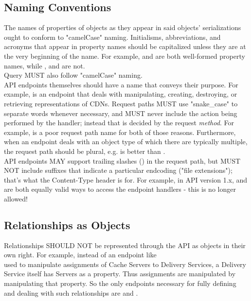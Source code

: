 \subsection{Naming Conventions}
The names of properties of objects as they appear in said objects'
serializations ought to conform to "camelCase" naming. Initialisms,
abbreviations, and acronyms that appear in property names should be capitalized
unless they are at the very beginning of the name. For example,
 and  are both well-formed property names,
while ,  and  are not.\\
Query MUST also follow "camelCase" naming.\\
API endpoints themselves should have a name that conveys their purpose. For
example,  is an endpoint that deals with manipulating, creating,
destroying, or retrieving representations of CDNs. Request paths MUST use
"snake\_case" to separate words whenever necessary, and MUST never include the
action being performed by the handler; instead that is decided by the request
\emph{method}. For example,  is a poor request path name
for both of those reasons. Furthermore, when an endpoint deals with an object
type of which there are typically multiple, the request path should be plural,
e.g.  is better than .\\
API endpoints MAY support trailing slashes (\code{/}) in the request path, but
MUST NOT include suffixes that indicate a particular endcoding
("file extensions"); that's what the Content-Type header is for. For example, in
API version 1.x,  and  are both equally valid ways
to access the  endpoint handlers - this is no longer allowed!

\subsection{Relationships as Objects}
Relationships SHOULD NOT be represented through the API as objects in their own
right. For example, instead of an endpoint like\\
 used to manipulate assignments of Cache
Servers to Delivery Services, a Delivery Service itself has Servers as a
property. Thus assignments are manipulated by manipulating that property. So the
only endpoints necessary for fully defining and dealing with such relationships
are  and .
